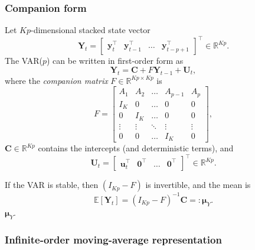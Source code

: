 \documentclass[11pt]{article}
\begin{document}
\subsubsection{Companion form}

Let $Kp$-dimensional stacked state vector
\begin{equation}
  \mathbf{Y}_t
  = \begin{bmatrix}
      \mathbf{y}_t^\top &
      \mathbf{y}_{t-1}^\top &
      \dots &
      \mathbf{y}_{t-p+1}^\top
    \end{bmatrix}^\top
  \in \mathbb{R}^{Kp}.
\end{equation}
The VAR($p$) can be written in first-order form as
\begin{equation}
  \mathbf{Y}_t
  = \mathbf{C}
  + F \mathbf{Y}_{t-1}
  + \mathbf{U}_t,
  \label{eq:companion}
\end{equation}
where the \emph{companion matrix} $F \in \mathbb{R}^{Kp \times Kp}$ is
\begin{equation}
  F =
  \begin{bmatrix}
    A_1 & A_2 & \dots & A_{p-1} & A_p \\
    I_K & 0   & \dots & 0       & 0   \\
    0   & I_K & \dots & 0       & 0   \\
    \vdots & \vdots & \ddots & \vdots & \vdots \\
    0   & 0   & \dots & I_K     & 0
  \end{bmatrix},
\end{equation}
$\mathbf{C} \in \mathbb{R}^{Kp}$ contains the intercepts (and deterministic
terms), and
\begin{equation}
  \mathbf{U}_t =
  \begin{bmatrix}
    \mathbf{u}_t^\top &
    \mathbf{0}^\top &
    \dots &
    \mathbf{0}^\top
  \end{bmatrix}^\top
  \in \mathbb{R}^{Kp}.
\end{equation}

If the VAR is stable, then $(I_{Kp} - F)$ is invertible, and the mean is
\begin{equation}
  \mathbb{E}[\mathbf{Y}_t]
  = (I_{Kp} - F)^{-1} \mathbf{C}
  =: \boldsymbol{\mu}_Y.
\end{equation}
$\boldsymbol{\mu}_Y$.

\subsubsection{Infinite-order moving-average representation}
\end{document}
